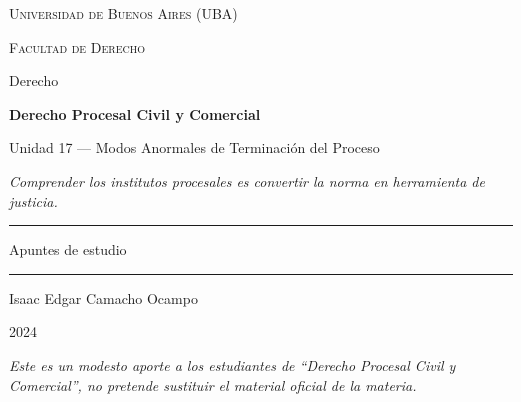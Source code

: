 \documentclass[12pt,oneside]{book}
\newcommand{\universidad}{Universidad de Buenos Aires (UBA)}
\newcommand{\facultad}{Facultad de Derecho}
\newcommand{\carrera}{Derecho}
\newcommand{\materia}{Derecho Procesal Civil y Comercial}
\newcommand{\titulo}{Unidad 17 --- Modos Anormales de Terminación del Proceso}
\newcommand{\autor}{Isaac Edgar Camacho Ocampo}
\newcommand{\anio}{2024}
\begin{document}
\begin{titlepage}

\thispagestyle{empty}

\begin{center}

\vspace*{1cm}

{\large \textsc{\universidad}}

\vspace{0.2cm}

{\large \textsc{\facultad}}

\vspace{0.2cm}

{\large \carrera}

\vspace{3cm}

{\Huge \textbf{\materia}}

\vspace{1cm}

{\LARGE \titulo}

\vspace{0.8cm}

\textit{Comprender los institutos procesales es convertir la norma en herramienta de justicia.}

\vspace{1.2cm}

\rule{0.70\textwidth}{0.5pt}

\vspace{0.5cm}

{\large Apuntes de estudio}

\vspace{0.5cm}

\rule{0.70\textwidth}{0.5pt}

\vfill

{\large \autor}

\vspace{0.3cm}

{\large \anio}

\end{center}

\vfill

\begin{flushleft}
\textit{Este es un modesto aporte a los estudiantes de ``Derecho Procesal Civil y Comercial'', no pretende sustituir el material oficial de la materia.}
\end{flushleft}

\end{titlepage}
\end{document}
